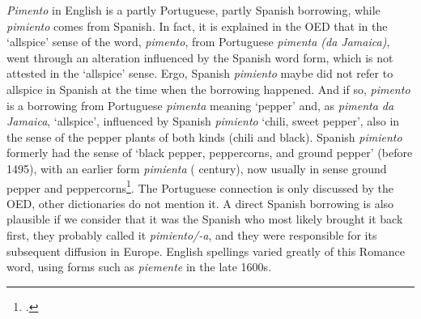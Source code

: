 \textit{Pimento} in English is a partly Portuguese, partly Spanish borrowing, while \textit{pimiento} comes from Spanish. In fact, it is explained in the \gls{OED} that in the `allspice' sense of the word, \textit{pimento}, from Portuguese \textit{pimenta (da Jamaica)}, went through an alteration influenced by the Spanish word form, which is not attested in the `allspice' sense. Ergo, Spanish \textit{pimiento} maybe did not refer to allspice in Spanish at the time when the borrowing happened. And if so, \textit{pimento} is a borrowing from Portuguese \textit{pimenta} meaning `pepper' and, as \textit{pimenta da Jamaica}, `allspice', influenced by Spanish \textit{pimiento} `chili, sweet pepper', also in the sense of the pepper plants of both kinds (chili and black). Spanish \textit{pimiento} formerly had the sense of `black pepper, peppercorns, and ground pepper' (before 1495), with an earlier form \textit{pimienta} ( century), now usually in sense ground pepper and peppercorns\footcite[pimento]{oed}. The Portuguese connection is only discussed by the \gls{OED}, other dictionaries do not mention it. A direct Spanish borrowing is also plausible if we consider that it was the Spanish who most likely brought it back first, they probably called it \textit{pimiento/-a}, and they were responsible for its subsequent diffusion in Europe. English spellings varied greatly of this Romance word, using forms such as \textit{piemente} in the late 1600s. 

